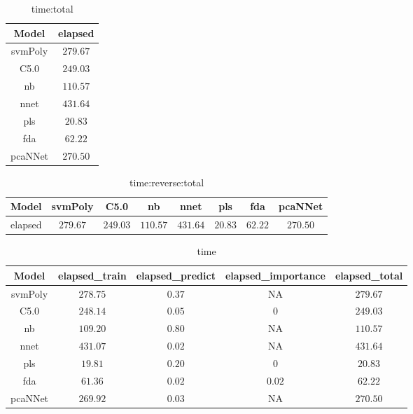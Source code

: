 \begin{table}[!ht]
	\centering
	\begin{tabular}{|c|c|}
		\hline
		Model & elapsed \\ \hline
		svmPoly & $279.67$ \\ \hline
		C5.0 & $249.03$ \\ \hline
		nb & $110.57$ \\ \hline
		nnet & $431.64$ \\ \hline
		pls & $20.83$ \\ \hline
		fda & $62.22$ \\ \hline
		pcaNNet & $270.50$ \\ \hline
	\end{tabular}
	\caption{time:total}
	\label{tab:time:total}
\end{table}

\begin{table}[!ht]
	\centering
	\begin{tabular}{|c|c|c|c|c|c|c|c|}
		\hline
		Model & svmPoly & C5.0 & nb & nnet & pls & fda & pcaNNet \\ \hline
		elapsed & $279.67$ & $249.03$ & $110.57$ & $431.64$ & $20.83$ & $62.22$ & $270.50$ \\ \hline
	\end{tabular}
	\caption{time:reverse:total}
	\label{tab:time:reverse:total}
\end{table}

\begin{table}[!ht]
	\centering
	\begin{tabular}{|c|c|c|c|c|}
		\hline
		Model & elapsed_train & elapsed_predict & elapsed_importance & elapsed_total \\ \hline
		svmPoly & $278.75$ & $0.37$ & NA & $279.67$ \\ \hline
		C5.0 & $248.14$ & $0.05$ & $0$ & $249.03$ \\ \hline
		nb & $109.20$ & $0.80$ & NA & $110.57$ \\ \hline
		nnet & $431.07$ & $0.02$ & NA & $431.64$ \\ \hline
		pls & $19.81$ & $0.20$ & $0$ & $20.83$ \\ \hline
		fda & $61.36$ & $0.02$ & $0.02$ & $62.22$ \\ \hline
		pcaNNet & $269.92$ & $0.03$ & NA & $270.50$ \\ \hline
	\end{tabular}
	\caption{time}
	\label{tab:time}
\end{table}

